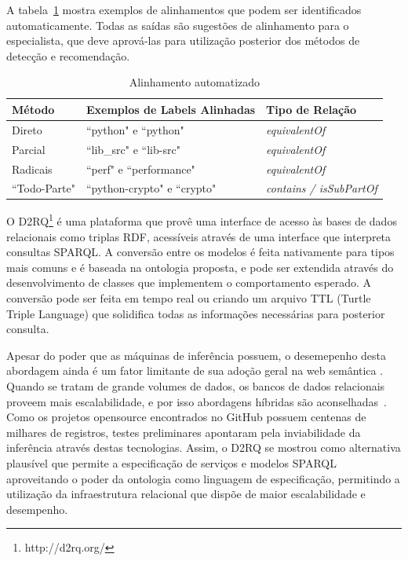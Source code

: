 \documentclass[sigconf]{acmart}
\begin{document}
A tabela~\ref{tab:matching} mostra exemplos de alinhamentos que podem ser identificados automaticamente. Todas as saídas são sugestões de alinhamento para o especialista, que deve aprová-las para utilização posterior dos métodos de detecção e recomendação.

\begin{table}[!h]
  \centering
\begin{tabular}{@{}|l|l|l|@{}}
\hline
Método       & Exemplos de Labels Alinhadas           & Tipo de Relação                 \\ \hline
Direto       & ``python" e ``python"        & \textit{equivalentOf}           \\
Parcial      & ``lib\_src" e ``lib-src"     & \textit{equivalentOf}           \\
Radicais     & ``perf" e ``performance"     & \textit{equivalentOf}           \\
``Todo-Parte" & ``python-crypto" e ``crypto" & \textit{contains / isSubPartOf} \\ \hline
\end{tabular}
\caption{Alinhamento automatizado}\label{tab:matching}
\end{table}

O D2RQ\footnote{http://d2rq.org/} é uma plataforma que provê uma interface de acesso às bases de dados relacionais como triplas RDF, acessíveis através de uma interface que interpreta consultas SPARQL. A conversão entre os modelos é feita nativamente para tipos mais comuns e é baseada na ontologia proposta, e pode ser extendida através do desenvolvimento de classes que implementem o comportamento esperado. A conversão pode ser feita em tempo real ou criando um arquivo TTL (Turtle Triple Language) que solidifica todas as informações necessárias para posterior consulta.

Apesar do poder que as máquinas de inferência possuem, o desemepenho desta abordagem ainda é um fator limitante de sua adoção geral na web semântica \cite{shvaiko2013}. Quando se tratam de grande volumes de dados, os bancos de dados relacionais proveem mais escalabilidade, e por isso abordagens híbridas são aconselhadas~\cite{hepp2008}. Como os projetos opensource encontrados no GitHub possuem centenas de milhares de registros, testes preliminares apontaram pela inviabilidade da inferência através destas tecnologias. Assim, o D2RQ se mostrou como alternativa plausível que permite a especificação de serviços e modelos SPARQL aproveitando o poder da ontologia como linguagem de especificação, permitindo a utilização da infraestrutura relacional que dispõe de maior escalabilidade e desempenho.
\end{document}
